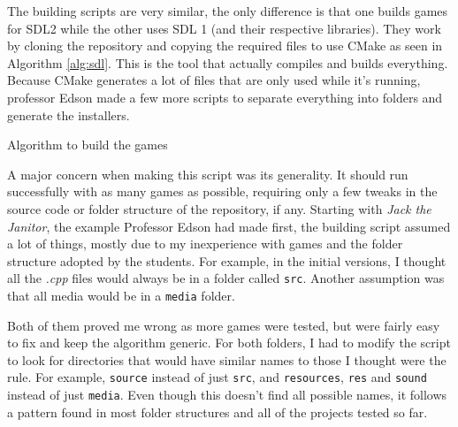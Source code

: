 The building scripts are very similar, the only difference is that one builds games for SDL2 while the other uses SDL 1 (and their respective libraries). They work by cloning the repository and copying the required files to use CMake as seen in Algorithm \ref{alg:sdl}. This is the tool that actually compiles and builds everything. Because CMake generates a lot of files that are only used while it's running, professor Edson made a few more scripts to separate everything into folders and generate the installers.

\begin{algorithm}[h!]
\caption{Algorithm to build the games}
\label{alg:sdl}
\begin{algorithmic}
\Start
{}  
\State {} 
 
 
\State {} 
\State {} 
\State {} 
\State {} 
\End
\end{algorithmic}
\end{algorithm}

A major concern when making this script was its generality. It should run successfully with as many games as possible, requiring only a few tweaks in the source code or folder structure of the repository, if any. Starting with \textit{Jack the Janitor}, the example Professor Edson had made first, the  building script assumed a lot of things, mostly due to my inexperience with games and the folder structure adopted by the students. For example, in the initial versions, I thought all the \textit{.cpp} files would always be in a folder called \texttt{src}. Another assumption was that all media would be in a \texttt{media} folder.

Both of them proved me wrong as more games were tested, but were fairly easy to fix and keep the algorithm generic. For both folders, I had to modify the script to look for directories that would have similar names to those I thought were the rule. For example, \texttt{source} instead of just \texttt{src}, and \texttt{resources}, \texttt{res} and \texttt{sound} instead of just \texttt{media}. Even though this doesn't find all possible names, it follows a pattern found in most folder structures and all of the projects tested so far.

